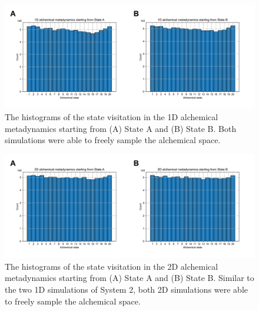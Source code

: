 \documentclass[journal=jacsat,manuscript=article]{achemso}
\begin{document}
\renewcommand{\thefigure}{S\arabic{figure}}
\begin{figure}[H]
    \centering
    \includegraphics[width=\textwidth]{Figures/1D_lambda_hist.png}   
    \caption{The histograms of the state visitation in the 1D alchemical metadynamics starting from (A) State A and (B) State B. Both simulations were able to freely sample the alchemical space.}
    \label{sys2_1D_hist}
\end{figure}

\renewcommand{\thefigure}{S\arabic{figure}}
\begin{figure}[H]
    \centering
    \includegraphics[width=\textwidth]{Figures/2D_lambda_hist.png}   
    \caption{The histograms of the state visitation in the 2D alchemical metadynamics starting from (A) State A and (B) State B. Similar to the two 1D simulations of System 2, both 2D simulations were able to freely sample the alchemical space.}
    \label{sys2_2D_hist}
\end{figure}
\end{document}
